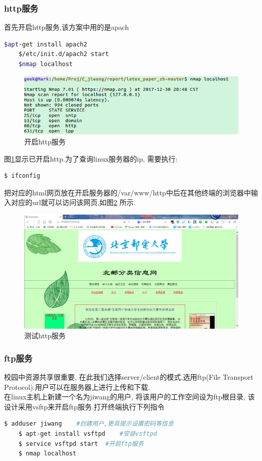 	\subsubsection{http服务}%
	首先开启http服务,该方案中用的是apach 
		\begin{lstlisting}[language=bash]
	$apt-get install apach2
	$/etc/init.d/apach2 start
	$nmap localhost
\end{lstlisting}
\begin{figure}[thbp!]
\centering
\includegraphics[width=0.9\linewidth]{figure/linux_http_start.png}
\caption{ 开启http服务}
\label{fig:linux_http_start}
\end{figure}

	\indent	图\ref{fig:linux_http_start}显示已开启http.为了查询linux服务器的ip, 需要执行:
		\begin{lstlisting}[language=bash]
	$ ifconfig
		\end{lstlisting}

\indent	把对应的html网页放在开启服务器的/var/www/http中后在其他终端的浏览器中输入对应的url就可以访问该网页,如图\ref{fig:linux_http_test} 所示.
		\begin{figure}[thbp!]
\centering
\includegraphics[width=0.9\linewidth]{figure/linux_http_test.png}
\caption{ 测试http服务}
\label{fig:linux_http_test}
\end{figure}
	\subsubsection{ftp服务}%
	校园中资源共享很重要, 在此我们选择server/client的模式,选用ftp(File Transport Protocol).用户可以在服务器上进行上传和下载.\\
\indent	在linux主机上新建一个名为jiwang的用户, 将该用户的工作空间设为ftp根目录, 该设计采用vsftp来开启ftp服务.打开终端执行下列指令
	\begin{lstlisting}[language=bash]
	$ adduser jiwang	#创建用户,更具提示设置密码等信息
	$ apt-get install vsftpd 	#安装vsftpd
	$ service vsftpd start  #开启ftp服务	
	$ nmap localhost
	
	\end{lstlisting}

